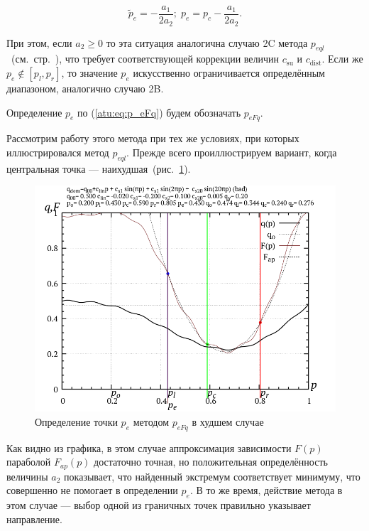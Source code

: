 \begin{equation}
  \tilde{p}_e = - \frac{a_1}{2 a_2};
  \;
  p_e = p_c - \frac{a_1}{2 a_2}.
  \label{atu:eq:p_eFq}
\end{equation}


При этом, если
$ a_2 \ge 0 $
то эта ситуация аналогична случаю 2C метода $p_{eql}$~(см.~стр.~\pageref{atu:d:p_eql_2A}),
что требует соответствующей коррекции величин $c_\mathrm{su}$ и $c_\mathrm{dist}$.
Если же $ p_e \notin [ p_l, p_r ] $, то значение $p_e$ искусственно
ограничивается определённым диапазоном, аналогично случаю 2B.

Определение $p_e$ по (\ref{atu:eq:p_eFq}) будем обозначать $p_{eFq}$.

Рассмотрим работу этого метода при тех же условиях,
при которых иллюстрировался метод $p_{eql}$.
Прежде всего проиллюстрируем вариант,
когда центральная точка --- наихудшая~(рис.~\ref{atu:f:p_eFq_bad}).


\begin{figure}[htb!]
  \centerline{\includegraphics[width=60\TW]{p/p_eFq/q_p_eFq_bad.png}}
  \caption{Определение точки $p_e$ методом $p_{eFq}$ в худшем случае}
  \label{atu:f:p_eFq_bad}
\end{figure}

Как видно из графика, в этом случае аппроксимация зависимости $F(p)$
параболой $F_{ap}(p)$ достаточно точная, но положительная определённость величины
$a_2$ показывает, что найденный экстремум соответствует минимуму,
что совершенно не помогает в определении $p_e$. В то же время,
действие метода в этом случае --- выбор одной из граничных точек
правильно указывает направление.

